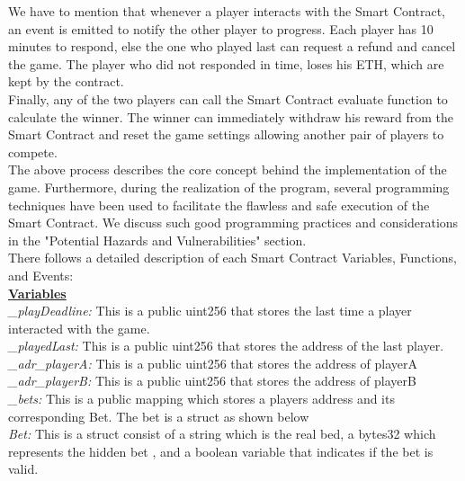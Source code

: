 \documentclass[12pt,a4paper]{article}
\begin{document}
We have to mention that whenever a player interacts with the Smart Contract,
an event is emitted to notify the other player to progress. Each player has
10 minutes to respond, else the one who played last can request a refund and
cancel the game. The player who did not responded in time, loses his ETH, which are kept
by the contract. \\

Finally, any of the two players can call the Smart Contract evaluate function to calculate the winner.
The winner can immediately withdraw his reward from the Smart Contract and reset the game settings
allowing another pair of players to compete. \\

The above process describes the core concept behind the implementation of the game.
Furthermore, during the realization of the program, several programming techniques have
been used to facilitate the flawless and safe execution of the Smart Contract. We discuss
such good programming practices and considerations in the "Potential Hazards and Vulnerabilities" section.\\

There follows a detailed description of each Smart Contract Variables, Functions, and Events: \\

\textbf{\underline{Variables}} \\

\emph{\_playDeadline:} This is a public uint256 that stores the last time a player interacted with the game.\\

\emph{\_playedLast:} This is a public uint256 that stores the address of the last player.\\

\emph{\_adr\_playerA:} This is a public uint256 that stores the address of playerA\\

\emph{\_adr\_playerB:} This is a public uint256 that stores the address of playerB \\

\emph{\_bets:} This is a public mapping which stores a players address and its corresponding Bet. The bet is a struct as shown below\\

\emph{Bet:} This is a struct consist of a string which is the real bed, a bytes32 which represents the hidden bet
, and a boolean variable that indicates if the bet is valid.\\
\end{document}
